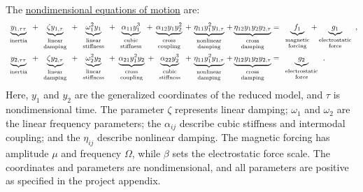 \documentclass[11pt]{article}
\newcommand{\termnote}[2]{\underbrace{#1}_{\begingroup\renewcommand{\arraystretch}{0.65}\begin{array}{c}#2\end{array}\endgroup}}
\begin{document}
The \underline{nondimensional equations of motion} are:
{\small
\begin{equation}
\begin{aligned}
\termnote{y_{1,\tau\tau}}{\text{\scriptsize inertia}}
+ \termnote{\zeta y_{1,\tau}}{\text{\scriptsize linear}\\\text{\scriptsize damping}}
+ \termnote{\omega_1^2 y_1}{\text{\scriptsize linear}\\\text{\scriptsize stiffness}}
+ \termnote{\alpha_{11} y_1^3}{\text{\scriptsize cubic}\\\text{\scriptsize stiffness}}
+ \termnote{\alpha_{12} y_1 y_2^2}{\text{\scriptsize cross}\\\text{\scriptsize coupling}}
+ \termnote{\eta_{11} y_1^2 y_{1,\tau}}{\text{\scriptsize nonlinear}\\\text{\scriptsize damping}}
+ \termnote{\eta_{12} y_1 y_2 y_{2,\tau}}{\text{\scriptsize cross}\\\text{\scriptsize damping}}
&= \termnote{f_1}{\text{\scriptsize magnetic}\\\text{\scriptsize forcing}}
\mkern-8mu+\mkern-8mu \termnote{g_1}{\text{\scriptsize electrostatic}\\\text{\scriptsize force}},\\
\termnote{y_{2,\tau\tau}}{\text{\scriptsize inertia}}
+ \termnote{\zeta y_{2,\tau}}{\text{\scriptsize linear}\\\text{\scriptsize damping}}
+ \termnote{\omega_2^2 y_2}{\text{\scriptsize linear}\\\text{\scriptsize stiffness}}
+ \termnote{\alpha_{21} y_1^2 y_2}{\text{\scriptsize cross}\\\text{\scriptsize coupling}}
+ \termnote{\alpha_{22} y_2^3}{\text{\scriptsize cubic}\\\text{\scriptsize stiffness}}
+ \termnote{\eta_{11} y_1^2 y_{1,\tau}}{\text{\scriptsize nonlinear}\\\text{\scriptsize damping}}
+ \termnote{\eta_{12} y_1 y_2 y_{2,\tau}}{\text{\scriptsize cross}\\\text{\scriptsize damping}}
&= \termnote{g_2}{\text{\scriptsize electrostatic}\\\text{\scriptsize force}}.
\end{aligned}
\end{equation}
}
Here, $y_1$ and $y_2$ are the generalized coordinates of the reduced model, and $\tau$ is nondimensional time. The parameter $\zeta$ represents linear damping; $\omega_1$ and $\omega_2$ are the linear frequency parameters; the $\alpha_{ij}$ describe cubic stiffness and intermodal coupling; and the $\eta_{ij}$ describe nonlinear damping. The magnetic forcing has amplitude $\mu$ and frequency $\Omega$, while $\beta$ sets the electrostatic force scale. The coordinates and parameters are nondimensional, and all parameters are positive as specified in the project appendix.
\end{document}
